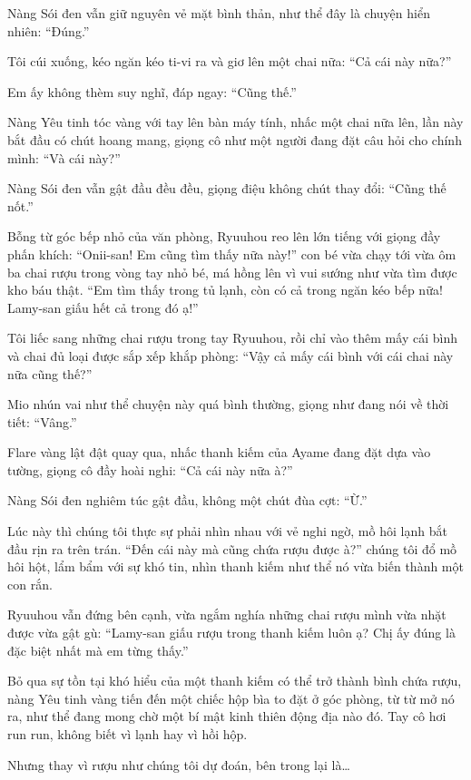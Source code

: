\documentclass[../main.tex]{subfiles}
\begin{document}
Nàng Sói đen vẫn giữ nguyên vẻ mặt bình thản, như thể đây là chuyện hiển nhiên: ``Đúng.''

Tôi cúi xuống, kéo ngăn kéo ti-vi ra và giơ lên một chai nữa: ``Cả cái này nữa?''

Em ấy không thèm suy nghĩ, đáp ngay: ``Cũng thế.''

Nàng Yêu tinh tóc vàng với tay lên bàn máy tính, nhấc một chai nữa lên, lần này bắt đầu có chút hoang mang, giọng cô như một người đang đặt câu hỏi cho chính mình: ``Và cái này?''

Nàng Sói đen vẫn gật đầu đều đều, giọng điệu không chút thay đổi: ``Cũng thế nốt.''

Bỗng từ góc bếp nhỏ của văn phòng, Ryuuhou reo lên lớn tiếng với giọng đầy phấn khích: ``Onii-san! Em cũng tìm thấy nữa này!'' con bé vừa chạy tới vừa ôm ba chai rượu trong vòng tay nhỏ bé, má hồng lên vì vui sướng như vừa tìm được kho báu thật. ``Em tìm thấy trong tủ lạnh, còn có cả trong ngăn kéo bếp nữa! Lamy-san giấu hết cả trong đó ạ!''

Tôi liếc sang những chai rượu trong tay Ryuuhou, rồi chỉ vào thêm mấy cái bình và chai đủ loại được sắp xếp khắp phòng: ``Vậy cả mấy cái bình với cái chai này nữa cũng thế?''

Mio nhún vai như thể chuyện này quá bình thường, giọng như đang nói về thời tiết: ``Vâng.''

Flare vàng lật đật quay qua, nhấc thanh kiếm của Ayame đang đặt dựa vào tường, giọng cô đầy hoài nghi: ``Cả cái này nữa à?''

Nàng Sói đen nghiêm túc gật đầu, không một chút đùa cợt: ``Ừ.''

Lúc này thì chúng tôi thực sự phải nhìn nhau với vẻ nghi ngờ, mồ hôi lạnh bắt đầu rịn ra trên trán. ``Đến cái này mà cũng chứa rượu được à?'' chúng tôi đổ mồ hôi hột, lẩm bẩm với sự khó tin, nhìn thanh kiếm như thể nó vừa biến thành một con rắn.

Ryuuhou vẫn đứng bên cạnh, vừa ngắm nghía những chai rượu mình vừa nhặt được vừa gật gù: ``Lamy-san giấu rượu trong thanh kiếm luôn ạ? Chị ấy đúng là đặc biệt nhất mà em từng thấy.''

Bỏ qua sự tồn tại khó hiểu của một thanh kiếm có thể trở thành bình chứa rượu, nàng Yêu tinh vàng tiến đến một chiếc hộp bìa to đặt ở góc phòng, từ từ mở nó ra, như thể đang mong chờ một bí mật kinh thiên động địa nào đó. Tay cô hơi run run, không biết vì lạnh hay vì hồi hộp.

Nhưng thay vì rượu như chúng tôi dự đoán, bên trong lại là\dots
\end{document}
